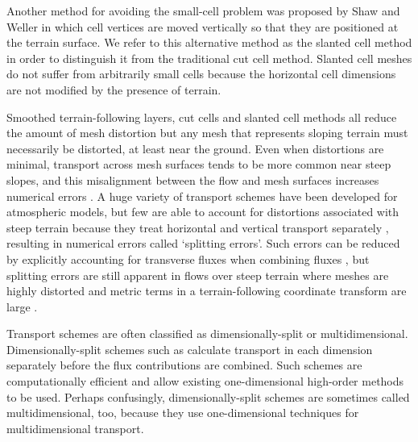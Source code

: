 Another method for avoiding the small-cell problem was proposed by Shaw and Weller \citep{shaw-weller2016} in which cell vertices are moved vertically so that they are positioned at the terrain surface.  We refer to this alternative method as the slanted cell method in order to distinguish it from the traditional cut cell method.  Slanted cell meshes do not suffer from arbitrarily small cells because the horizontal cell dimensions are not modified by the presence of terrain.

Smoothed terrain-following layers, cut cells and slanted cell methods all reduce the amount of mesh distortion but any mesh that represents sloping terrain must necessarily be distorted, at least near the ground.
Even when distortions are minimal, transport across mesh surfaces tends to be more common near steep slopes, and this misalignment between the flow and mesh surfaces increases numerical errors \citep{leonard1993,schaer2002,shaw-weller2016}.
A huge variety of transport schemes have been developed for atmospheric models, but few are able to account for distortions associated with steep terrain because they treat horizontal and vertical transport separately \citep{kent2014}, resulting in numerical errors called `splitting errors'.
Such errors can be reduced by explicitly accounting for transverse fluxes when combining fluxes \citep{leonard1996}, but splitting errors are still apparent in flows over steep terrain where meshes are highly distorted and metric terms in a terrain-following coordinate transform are large \citep{weller2017}.

Transport schemes are often classified as dimensionally-split or multidimensional.
Dimensionally-split schemes such as \citep{lin-rood1996,katta2015} calculate transport in each dimension separately before the flux contributions are combined.  Such schemes are computationally efficient and allow existing one-dimensional high-order methods to be used.
Perhaps confusingly, dimensionally-split schemes are sometimes called multidimensional, too, because they use one-dimensional techniques for multidimensional transport.

